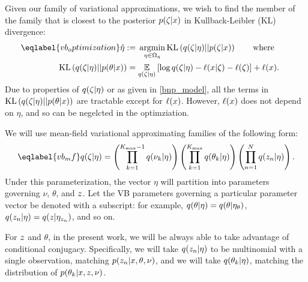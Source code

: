 Given our family of variational approximations, we wish to find the member of
the family that is closest to the posterior $p(\zeta \vert x)$ in
Kullback-Leibler (KL) divergence:
%
\begin{align}\eqlabel{vb_optimization}
%
\etaopt :={}&
    \argmin_{\eta \in \etadom}
        \KL{\q(\zeta \vert \eta) || p(\zeta \vert \x)} \mathwhere \\
\KL{\q(\zeta \vert \eta) || p(\theta \vert \x)}
={}&    \expect{\q(\zeta \vert \eta)}{
        \log \q(\zeta \vert \eta) - \logp(\x \vert \zeta) -
        \logp(\zeta)} + \logp(\x). \nonumber
%
\end{align}
%
Due to properties of $q(\zeta \vert \eta)$ or as given in \eqref{bnp_model},
all the terms in $\mathrm{KL}\left(q(\zeta \vert \eta) || p(\theta \vert x)\right)$ are tractable
except for $\ell(x)$.  However, $\ell(x)$ does not depend on $\eta$, and
so can be negelcted in the optimziation.

We will use mean-field variational approximating families of the following form:
%
\begin{align}\eqlabel{vb_mf}
%
\q(\zeta \vert \eta) =
    \left( \prod_{\k=1}^{\kmax - 1} \q(\nu_\k \vert \eta) \right)
    \left( \prod_{\k=1}^{\kmax} \q(\theta_\k \vert \eta) \right)
    \left( \prod_{\n=1}^{\N} \q(\z_{\n} \vert \eta) \right).
%
\end{align}
%
Under this parameterization, the vector $\eta$ will partition into parameters
governing $\nu$, $\theta$, and $z$.  Let the VB parameters governing a
particular parameter vector be denoted with a subscript: for example, $q(\theta
\vert \eta) = q(\theta \vert \eta_{\theta})$, $q(z_n \vert \eta) = q(z \vert
\eta_{z_{n}})$, and so on.

For $z$ and $\theta$, in the present work, we will be always able to take
advantage of conditional conjugacy.  Specifically, we will take $q(z_{n}
\vert \eta)$ to be multinomial with a single observation, matching $p(z_{n}
\vert x, \theta, \nu)$, and we will take $q(\theta_k \vert \eta)$, matching
the distribution of $p(\theta_{k} \vert x, z, \nu)$.


